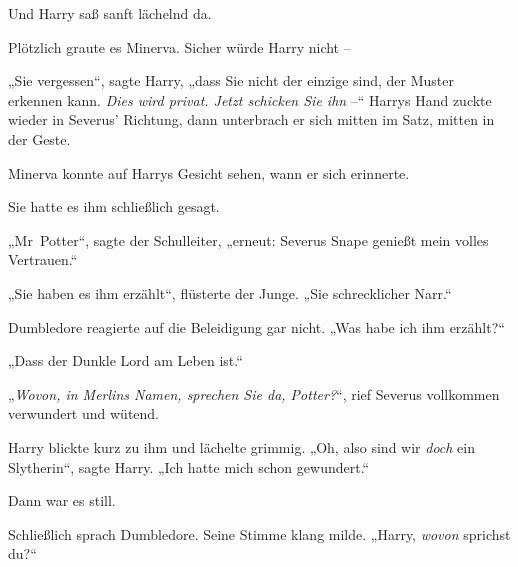 Und Harry saß sanft lächelnd da.

Plötzlich graute es Minerva. Sicher würde Harry nicht –

„Sie vergessen“, sagte Harry, „dass Sie nicht der einzige sind, der Muster erkennen kann. \emph{Dies wird privat. Jetzt schicken Sie ihn} –“ Harrys Hand zuckte wieder in Severus’ Richtung, dann unterbrach er sich mitten im Satz, mitten in der Geste.

Minerva konnte auf Harrys Gesicht sehen, wann er sich erinnerte.

Sie hatte es ihm schließlich gesagt.

„Mr~Potter“, sagte der Schulleiter, „erneut: Severus Snape genießt mein volles Vertrauen.“

„Sie haben es ihm erzählt“, flüsterte der Junge. „Sie schrecklicher Narr.“

Dumbledore reagierte auf die Beleidigung gar nicht. „Was habe ich ihm erzählt?“

„Dass der Dunkle Lord am Leben ist.“

„\emph{Wovon, in Merlins Namen, sprechen Sie da, Potter?}“, rief Severus vollkommen verwundert und wütend.

Harry blickte kurz zu ihm und lächelte grimmig. „Oh, also sind wir \emph{doch} ein Slytherin“, sagte Harry. „Ich hatte mich schon gewundert.“

Dann war es still.

Schließlich sprach Dumbledore. Seine Stimme klang milde. „Harry, \emph{wovon} sprichst du?“


